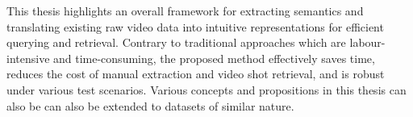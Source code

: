 This thesis highlights an overall framework for extracting semantics and translating existing raw video data into %
intuitive representations for
efficient querying and retrieval.
Contrary to traditional approaches which are labour-intensive and time-consuming, the proposed method effectively saves time, reduces the cost of manual extraction and video shot retrieval,
and is robust under various test scenarios.
Various concepts and propositions in this thesis can also be can also be extended to datasets of similar nature.


